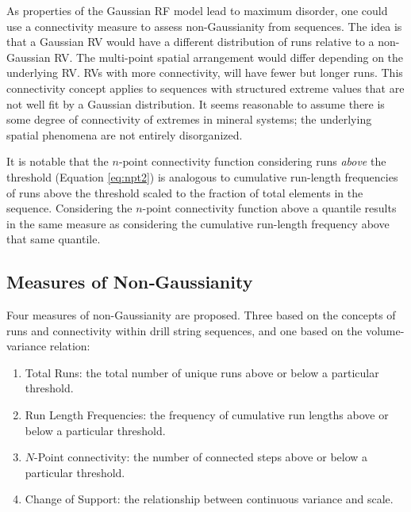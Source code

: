 As properties of the Gaussian \gls{RF} model lead to maximum disorder, one could use a connectivity measure to assess non-Gaussianity from sequences. The idea is that a Gaussian \gls{RV} would have a different distribution of runs relative to a non-Gaussian \gls{RV}. The multi-point spatial arrangement would differ depending on the underlying \gls{RV}. \Glspl{RV} with more connectivity, will have fewer but longer runs. This connectivity concept applies to sequences with structured extreme values that are not well fit by a Gaussian distribution. It seems reasonable to assume there is some degree of connectivity of extremes in mineral systems; the underlying spatial phenomena are not entirely disorganized.

It is notable that the $n\text{-point}$ connectivity function considering runs \emph{above} the threshold (Equation \ref{eq:npt2}) is analogous to cumulative run-length frequencies of runs above the threshold scaled to the fraction of total elements in the sequence. Considering the $n\text{-point}$ connectivity function above a quantile results in the same measure as considering the cumulative run-length frequency above that same quantile.

\FloatBarrier
\subsection{Measures of Non‐Gaussianity}
\label{subsec:03ngmeasures}

Four measures of non-Gaussianity are proposed. Three based on the concepts of runs and connectivity within drill string sequences, and one based on the volume-variance relation:
\begin{enumerate}[noitemsep]
    \item Total Runs: the total number of unique runs above or below a particular threshold.
    \item Run Length Frequencies: the frequency of cumulative run lengths above or below a particular threshold.
    \item $N$-Point connectivity: the number of connected steps above or below a particular threshold.
    \item Change of Support: the relationship between continuous variance and scale.
\end{enumerate}

